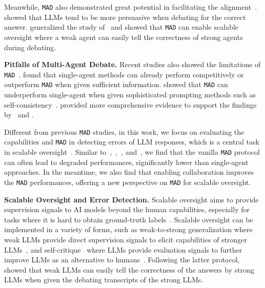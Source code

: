 \documentclass{article} %
\newcommand{\mad}[0]{\texttt{MAD}\xspace}
\begin{document}
Meanwhile, \mad also demonstrated great potential in facilitating the alignment~\citep{ai_safety_debate,khan2024debating,kenton2024on}. \citet{khan2024debating} showed that LLMs tend to be more persuasive when debating for the correct answer. \citet{kenton2024on} generalized the study of~\citet{khan2024debating} and showed that \mad can enable scalable oversight where a weak agent can easily tell the correctness of strong agents during debating.


\textbf{Pitfalls of Multi-Agent Debate.} Recent studies also showed the limitations of \mad~\citep{wang-etal-2024-rethinking-bounds,Smit2023ShouldWB,Zhang2025IfMD}. \citet{wang-etal-2024-rethinking-bounds} found that single-agent methods can already perform competitively or outperform \mad when given sufficient information. \citet{Smit2023ShouldWB} showed that \mad can underperform single-agent when given sophisticated prompting methods such as self-consistency~\citep{wang2023selfconsistency}. \citet{Zhang2025IfMD,Yang2025RevisitingMD} provided more comprehensive evidence to support the findings by~\citet{wang-etal-2024-rethinking-bounds} and \citet{Smit2023ShouldWB}.

Different from previous \mad studies, in this work, we focus on evaluating the capabilities and \mad in detecting errors of LLM responses, which is a central task in scalable oversight~\citep{realmistake}. Similar to~\citet{wang-etal-2024-rethinking-bounds},~\citet{Smit2023ShouldWB},~\citet{Zhang2025IfMD}, and~\citet{Yang2025RevisitingMD}, we find that the vanilla \mad protocol can often lead to degraded performances, significantly lower than single-agent approaches. In the meantime, we also find that enabling collaboration improves the \mad performances, offering a new perspective on \mad for scalable oversight.




\textbf{Scalable Oversight and Error Detection.} 
Scalable oversight aims to provide supervision signals to AI models beyond the human capabilities, especially for tasks where it is hard to obtain ground-truth labels~\citep{amodei2016concrete,christiano2018supervising,ai_safety_debate,bowman2022measuring}. 
Scalable oversight can be implemented in a variety of forms, such as weak-to-strong generalization where weak LLMs provide direct supervision signals to elicit capabilities of stronger LLMs~\citep{Burns2023WeaktoStrongGE}, and self-critique~\citep{Saunders2022SelfcritiquingMF} where LLMs provide evaluation signals to further improve LLMs as an alternative to humans~\citep{bowman2022measuring}. Following the latter protocol, \citet{kenton2024on} showed that weak LLMs can easily tell the correctness of the answers by strong LLMs when given the debating transcripts of the strong LLMs.
\end{document}
